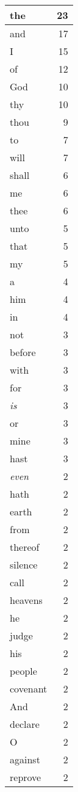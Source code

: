 \begin{center}
\begin{longtable}{l|r}
\hline \hline
\endlastfoot
the & 23 \\ \hline
and & 17 \\ \hline
I & 15 \\ \hline
of & 12 \\ \hline
God & 10 \\ \hline
thy & 10 \\ \hline
thou & 9 \\ \hline
to & 7 \\ \hline
will & 7 \\ \hline
shall & 6 \\ \hline
me & 6 \\ \hline
thee & 6 \\ \hline
unto & 5 \\ \hline
that & 5 \\ \hline
my & 5 \\ \hline
a & 4 \\ \hline
him & 4 \\ \hline
in & 4 \\ \hline
not & 3 \\ \hline
before & 3 \\ \hline
with & 3 \\ \hline
for & 3 \\ \hline
\emph{is} & 3 \\ \hline
or & 3 \\ \hline
mine & 3 \\ \hline
hast & 3 \\ \hline
\emph{even} & 2 \\ \hline
hath & 2 \\ \hline
earth & 2 \\ \hline
from & 2 \\ \hline
thereof & 2 \\ \hline
silence & 2 \\ \hline
call & 2 \\ \hline
heavens & 2 \\ \hline
he & 2 \\ \hline
judge & 2 \\ \hline
his & 2 \\ \hline
people & 2 \\ \hline
covenant & 2 \\ \hline
And & 2 \\ \hline
declare & 2 \\ \hline
O & 2 \\ \hline
against & 2 \\ \hline
reprove & 2 \\ \hline

\end{longtable}
\end{center}
